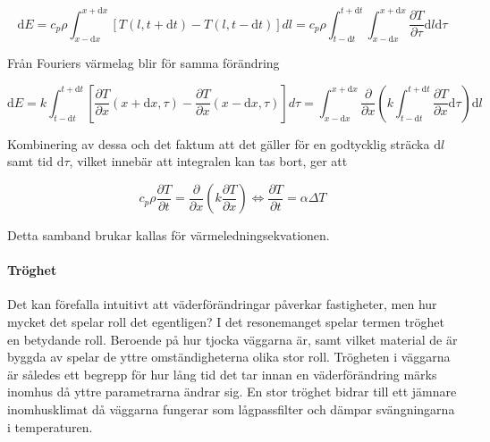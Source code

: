 \begin{equation}
\mathrm{d}E = c_p \rho \int_{x-\mathrm{d}x}^{x+\mathrm{d}x} \left[ T\left( l, t+\mathrm{d}t\right) - T\left( l, t-\mathrm{d}t\right)\right]dl = c_p \rho \int_{t-\mathrm{d}t}^{t+\mathrm{d}t} \int_{x-\mathrm{d}x}^{x+\mathrm{d}x} \frac{\partial T}{\partial \tau} \mathrm{d}l\mathrm{d}\tau
\end{equation}

Från Fouriers värmelag blir för samma förändring

\begin{equation}
\mathrm{d}E = k\int_{t-\mathrm{d}t}^{t+\mathrm{d}t} \left[ \frac{\partial T}{\partial x}\left( x + \mathrm{d}x, \tau \right) - \frac{\partial T}{\partial x}\left( x-\mathrm{d}x, \tau \right)\right]d\tau =  \int_{x-\mathrm{d}x}^{x+\mathrm{d}x} \frac{\partial}{\partial x} \left( k \int_{t-\mathrm{d}t}^{t+\mathrm{d}t} \frac{\partial T}{\partial x} \mathrm{d}\tau \right)\mathrm{d}l
\end{equation}

Kombinering av dessa och det faktum att det gäller för en godtycklig sträcka $\mathrm{d}l$ samt tid $\mathrm{d}\tau$, vilket innebär att integralen kan tas bort, ger att

\begin{equation}\label{eq:conduction:heateq}\boxed{ \; \; \;
c_p \rho \frac{\partial T}{\partial t} = \frac{\partial}{\partial x} \left( k \frac{\partial T}{\partial x} \right) \Leftrightarrow \frac{\partial T}{\partial t} = \alpha \Delta T
\; \; \; }
\end{equation}

Detta samband brukar kallas för värmeledningsekvationen.

\paragraph{Tröghet}
Det kan förefalla intuitivt att väderförändringar påverkar fastigheter, men hur mycket det spelar roll det egentligen? I det resonemanget spelar termen tröghet en betydande roll. Beroende på hur tjocka väggarna är, samt vilket material de är byggda av spelar de yttre omständigheterna olika stor roll. Trögheten i väggarna är således ett begrepp för hur lång tid det tar innan en väderförändring märks inomhus då yttre parametrarna ändrar sig. En stor tröghet bidrar till ett jämnare inomhusklimat då väggarna fungerar som lågpassfilter och dämpar svängningarna i temperaturen.
